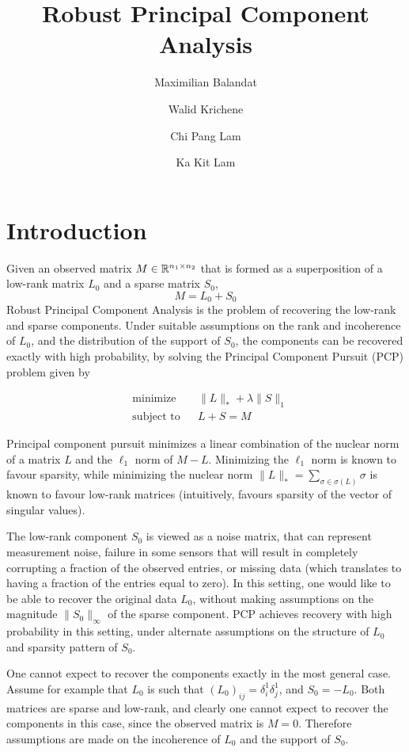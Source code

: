 \documentclass{../common/projectreport}
\title{\Large Robust Principal Component Analysis}
\author{Maximilian Balandat \and Walid Krichene \and Chi Pang Lam \and Ka Kit Lam}
\begin{document}
\maketitle

\section{Introduction}
Given an observed matrix $M \in {\mathbb R}^{n_1 \times n_2}$ that is formed as a superposition of a low-rank matrix $L_0$ and a sparse matrix $S_0$, 
\[
M = L_0 + S_0
\]
Robust Principal Component Analysis \cite{Candes:2011fk} is the problem of recovering the low-rank and sparse components. Under suitable assumptions on the rank and incoherence of $L_0$, and the distribution of the support of $S_0$, the components can be recovered exactly with high probability, by solving the Principal Component Pursuit (PCP) problem given by

\begin{equation}
\begin{aligned}
&\text{minimize} && \|L\|_* + \lambda \|S\|_1 \\
&\text{subject to} && L+S = M
\label{eq:pcp}
\end{aligned}
\end{equation}

Principal component pursuit minimizes a linear combination of the nuclear norm of a matrix $L$ and the $\ell_1$ norm of $M-L$. Minimizing the $\ell_1$ norm is known to favour sparsity, while minimizing the nuclear norm $\|L\|_* = \sum_{\sigma \in \sigma(L)} \sigma$ is known to favour low-rank matrices (intuitively, favours sparsity of the vector of singular values).

The low-rank component $S_0$ is viewed as a noise matrix, that can represent measurement noise, failure in some sensors that will result in completely corrupting a fraction of the observed entries, or missing data (which translates to having a fraction of the entries equal to zero). In this setting, one would like to be able to recover the original data $L_0$, without making assumptions on the magnitude $\|S_0\|_\infty$ of the sparse component. PCP achieves recovery with high probability in this setting, under alternate assumptions on the structure of $L_0$ and sparsity pattern of $S_0$.

One cannot expect to recover the components exactly in the most general case. Assume for example that $L_0$ is such that $(L_0)_{ij} = \delta_i^1\delta_j^1$, and $S_0 = -L_0$. Both matrices are sparse and low-rank, and clearly one cannot expect to recover the components in this case, since the observed matrix is $M = 0$. Therefore assumptions are made on the incoherence of $L_0$ and the support of $S_0$.
\end{document}
